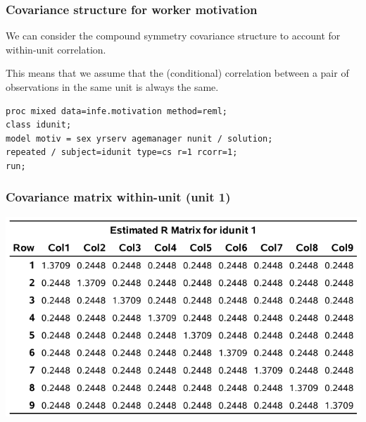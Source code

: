 \documentclass{beamer}
\begin{document}
\begin{frame}[fragile]
\frametitle{Covariance structure for worker motivation}
\bi
\item We can consider the compound symmetry covariance structure to account for within-unit correlation. 
\bi

\item This means that we assume that the (conditional) correlation between a pair of observations in the same unit is always the same.
\ei
   
 \begin{tcolorbox}[colback=white, colframe=hecblue, title=\SASlang{} code for a linear model with equicorrelated errors]
 \begin{small}
\begin{verbatim}
proc mixed data=infe.motivation method=reml; 
class idunit; 
model motiv = sex yrserv agemanager nunit / solution; 
repeated / subject=idunit type=cs r=1 rcorr=1; 
run;
\end{verbatim}
\end{small}
\end{tcolorbox}
\ei
\end{frame}
% 

 \begin{frame}
\frametitle{Covariance matrix within-unit (unit 1)}
\begin{center}
\includegraphics[width = 0.85\linewidth]{img/c6/slides7-e07}

\end{center}
\end{frame}
\end{document}
